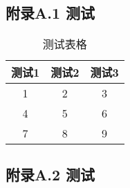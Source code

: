 
\chapter{}

\section*{附录A.1 \quad 测试}
\begin{table}[H]
        \centering
        \caption{测试表格}
        \begin{tabular}{|c|c|c|}
                \hline
                \textbf{测试1} & \textbf{测试2} & \textbf{测试3} \\
                \hline
                1 & 2 & 3 \\
                4 & 5 & 6 \\
                7 & 8 & 9 \\
                \hline
        \end{tabular}
        \label{tab:2}
\end{table}
\section*{附录A.2 \quad 测试}
\pkuthssffaq